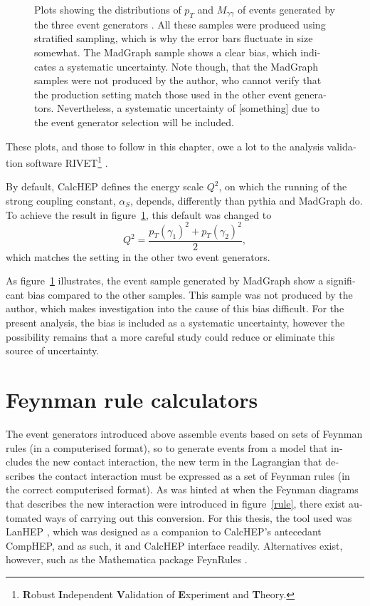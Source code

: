 \begin{english}
\begin{figure}[hbtp]
\begin{minipage}[b]{.3\textwidth}
\phantom{p}
\end{minipage}
\caption{Plots showing the distributions of $p_T$ and $M_{\gamma\gamma}$ of events generated by the three event generators \cite{calchep} \cite{pythia} \cite{madgraph5}. All these samples were produced using stratified sampling, which is why the error bars fluctuate in size somewhat. The MadGraph sample shows a clear bias, which indicates a systematic uncertainty. Note though, that the MadGraph samples were not produced by the author, who cannot verify that the production setting match those used in the other event generators. Nevertheless, a systematic uncertainty of [something] due to the event generator selection will be included.
\label{evgen}}
\end{figure}

These plots, and those to follow in this chapter, owe a lot to the analysis validation software RIVET\footnote{\textbf{R}obust \textbf{I}ndependent \textbf{V}alidation of \textbf{E}xperiment and \textbf{T}heory.} \cite{rivet}.

By default, CalcHEP defines the energy scale $Q^2$, on which the running of the strong coupling constant, $\alpha_S$, depends, differently than pythia and MadGraph do. To achieve the result in figure~\ref{evgen}, this default was changed to 
\[Q^2=\frac{p_T(\gamma_1)^2+p_T(\gamma_2)^2}{2},\]
which matches the setting in the other two event generators.

As figure~\ref{evgen} illustrates, the event sample generated by MadGraph show a significant bias compared to the other samples. This sample was not produced by the author, which makes investigation into the cause of this bias difficult. For the present analysis, the bias is included as a systematic uncertainty, however the possibility remains that a more careful study could reduce or eliminate this source of uncertainty.


\section{Feynman rule calculators}
The event generators introduced above assemble events based on sets of Feynman rules (in a computerised format), so to generate events from a model that includes the new contact interaction, the new term in the Lagrangian that describes the contact interaction must be expressed as a set of Feynman rules (in the correct computerised format). As was hinted at when the Feynman diagrams that describes the new interaction were introduced in figure~\ref{rule}, there exist automated ways of carrying out this conversion. For this thesis, the tool used was LanHEP \cite{lanhep}, which was designed as a companion to CalcHEP's antecedant CompHEP, and as such, it and CalcHEP interface readily. Alternatives exist, however, such as the Mathematica package FeynRules \cite{feynrules}. 


\end{english}
